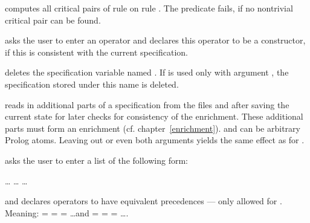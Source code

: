 \begin{command}
computes all critical pairs of rule  on rule . 
The predicate fails, if no nontrivial critical pair can be found.
\end{command}

\begin{command}
asks the user to enter an operator and declares this operator to be
a constructor, if this is consistent with the current specification.
\end{command}


\begin{command}
deletes the specification variable named
. If  is used only
with argument , the specification stored under this name is
deleted.
\end{command}

\begin{command}
reads in additional parts of a specification from the files 
 and 
after saving the current state for later checks for consistency of the enrichment. 
These additional parts must form an enrichment (cf. chapter~\ref{enrichment}).
 and  can be arbitrary Prolog atoms.
Leaving out  or even both arguments yields the same
effect as for . 
\end{command}
 

\begin{command}
asks the user to enter a list of the following form: 
\begin{center}
\kw{[}\kw{[}\kw{,}\kw{,}\kw{,} \ldots \kw{],}
\kw{[}\kw{,}\kw{,}\kw{,} \ldots \kw{],} \ldots \kw{]}
\end{center}
and declares operators to have equivalent precedences 
--- only allowed for .\\
Meaning:  =  =  = \ldots and  =  =  = \ldots.
\end{command}


